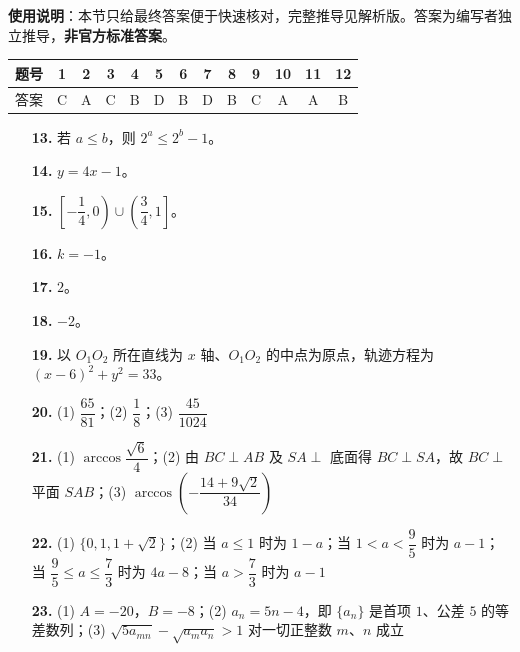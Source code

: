 
\begin{gknotice}
\textbf{使用说明}：本节只给最终答案便于快速核对，完整推导见解析版。答案为编写者独立推导，\textbf{非官方标准答案}。
\end{gknotice}

\begin{center}\begin{tabular}{ccccccccccccc}
\toprule
题号 & 1 & 2 & 3 & 4 & 5 & 6 & 7 & 8 & 9 & 10 & 11 & 12 \\
\midrule
答案 & C & A & C & B & D & B & D & B & C & A & A & B \\
\bottomrule
\end{tabular}\end{center}

\begin{itemize}[leftmargin=2.6em]
  \item[\textbf{13.}] 若 $a \leqslant b$，则 $2^a \leqslant 2^b - 1$。
  \item[\textbf{14.}] $y = 4x - 1$。
  \item[\textbf{15.}] $\left[-\dfrac{1}{4}, 0\right) \cup \left(\dfrac{3}{4}, 1\right]$。
  \item[\textbf{16.}] $k = -1$。
  \item[\textbf{17.}] $2$。
  \item[\textbf{18.}] $-2$。
\end{itemize}

\begin{itemize}[leftmargin=2.6em]
  \item[\textbf{19.}] 以 $O_1O_2$ 所在直线为 $x$ 轴、$O_1O_2$ 的中点为原点，轨迹方程为 $(x - 6)^2 + y^2 = 33$。
  \item[\textbf{20.}] (1) $\dfrac{65}{81}$；(2) $\dfrac{1}{8}$；(3) $\dfrac{45}{1024}$
  \item[\textbf{21.}] (1) $\arccos\dfrac{\sqrt{6}}{4}$；(2) 由 $BC \perp AB$ 及 $SA \perp$ 底面得 $BC \perp SA$，故 $BC \perp$ 平面 $SAB$；(3) $\arccos\left(-\dfrac{14 + 9\sqrt{2}}{34}\right)$
  \item[\textbf{22.}] (1) $\{0, 1, 1 + \sqrt{2}\}$；(2) 当 $a \leqslant 1$ 时为 $1 - a$；当 $1 < a < \dfrac{9}{5}$ 时为 $a - 1$；当 $\dfrac{9}{5} \leqslant a \leqslant \dfrac{7}{3}$ 时为 $4a - 8$；当 $a > \dfrac{7}{3}$ 时为 $a - 1$
  \item[\textbf{23.}] (1) $A = -20$，$B = -8$；(2) $a_n = 5n - 4$，即 $\{a_n\}$ 是首项 $1$、公差 $5$ 的等差数列；(3) $\sqrt{5a_{mn}} - \sqrt{a_m a_n} > 1$ 对一切正整数 $m$、$n$ 成立
\end{itemize}

